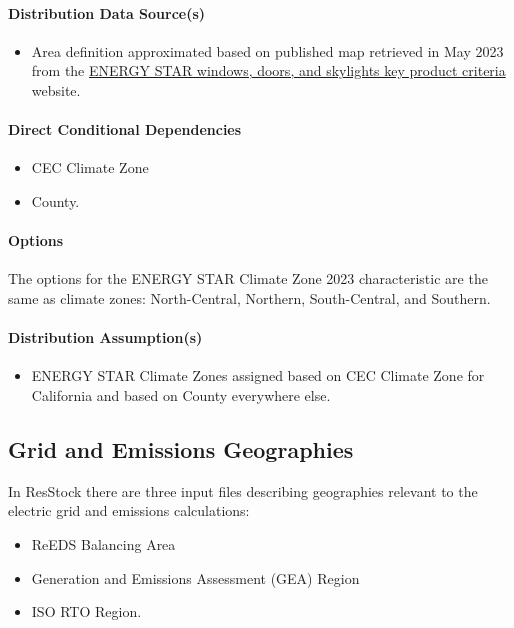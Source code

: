 \paragraph{Distribution Data Source(s)}
\begin{itemize}
    \item Area definition approximated based on published map retrieved in May 2023 from the \href{https://www.energystar.gov/products/residential_windows_doors_and_skylights/key_product_criteria}{ENERGY STAR windows, doors, and skylights key product criteria} website. 
\end{itemize}

\paragraph{Direct Conditional Dependencies}
\begin{itemize}
    \item CEC Climate Zone
    \item County.
\end{itemize}

\paragraph{Options}
The options for the ENERGY STAR Climate Zone 2023 characteristic are the same as climate zones: North-Central, Northern, South-Central, and Southern. 

\paragraph{Distribution Assumption(s)}
\begin{itemize}
    \item ENERGY STAR Climate Zones assigned based on CEC Climate Zone for California and based on County everywhere else.
\end{itemize}

\subsection{Grid and Emissions Geographies}

In ResStock there are three input files describing geographies relevant to the electric grid and emissions calculations:

\begin{itemize}
    \item ReEDS Balancing Area
    \item Generation and Emissions Assessment (GEA) Region
    \item ISO RTO Region.
\end{itemize}

